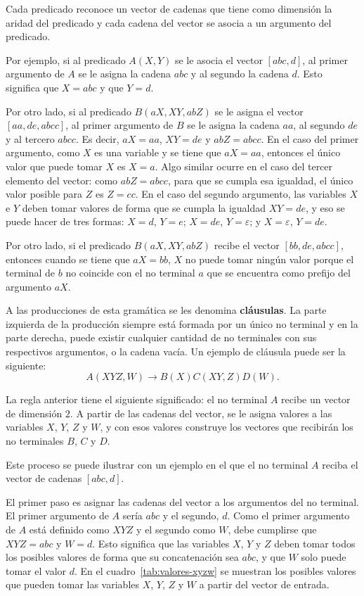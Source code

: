 \documentclass{report}
\theoremstyle{definition}
\theoremstyle{plain}
\theoremstyle{remark}
\begin{document}
Cada predicado reconoce un vector de cadenas que tiene como dimensión la
aridad del predicado y cada cadena del vector se asocia a un argumento
del predicado.

Por ejemplo, si al predicado $A(X, Y)$ se le asocia el vector $[abc, d]$,
al primer argumento de $A$ se le asigna la cadena $abc$ y al segundo la
cadena $d$. Esto significa que $X = abc$ y que $Y = d$.

Por otro lado, si al predicado $B(aX, XY, abZ)$ se le asigna el vector
$[aa, de, abcc]$, al primer argumento de $B$ se le asigna la cadena $aa$,
al segundo $de$ y al tercero $abcc$. Es decir, $aX = aa$, $XY = de$ y
$abZ = abcc$. En el caso del primer argumento, como $X$ es una variable
y se tiene que $aX = aa$, entonces el único valor que puede tomar $X$ es
$X = a$. Algo similar ocurre en el caso del tercer elemento del vector:
como $abZ = abcc$, para que se cumpla esa igualdad, el único valor
posible para $Z$ es $Z = cc$. En el caso del segundo argumento, las
variables $X$ e $Y$ deben tomar valores de forma que se cumpla la
igualdad $XY = de$, y eso se puede hacer de tres formas: $X = d$,
$Y = e$; $X = de$, $Y = \varepsilon$; y $X = \varepsilon$, $Y = de$.

Por otro lado, si el predicado $B(aX, XY, abZ)$ recibe el vector
$[bb, de, abcc]$, entonces cuando se tiene que $aX = bb$, $X$ no puede
tomar ningún valor porque el terminal de $b$ no coincide con el no
terminal $a$ que se encuentra como prefijo del argumento $aX$.

A las producciones de esta gramática se les denomina \textbf{cláusulas}.
La parte izquierda de la producción siempre está formada por un único no
terminal y en la parte derecha, puede existir cualquier cantidad de no
terminales con sus respectivos argumentos, o la cadena vacía. Un ejemplo
de cláusula puede ser la siguiente:
\[
  A(XYZ, W) \to B(X) C(XY, Z) D(W).
\]

La regla anterior tiene el siguiente significado: el no terminal $A$
recibe un vector de dimensión $2$. A partir de las cadenas del vector,
se le asigna valores a las variables $X$, $Y$, $Z$ y $W$, y con esos
valores construye los vectores que recibirán los no terminales $B$, $C$
y $D$.

Este proceso se puede ilustrar con un ejemplo en el que el no terminal
$A$ reciba el vector de cadenas $[abc, d]$.

El primer paso es asignar las cadenas del vector a los argumentos del no
terminal. El primer argumento de $A$ sería $abc$ y el segundo, $d$.
Como el primer argumento de $A$ está definido como $XYZ$ y el segundo
como $W$, debe cumplirse que $XYZ = abc$ y $W = d$. Esto significa que
las variables $X$, $Y$ y $Z$ deben tomar todos los posibles valores de
forma que su concatenación sea $abc$, y que $W$ solo puede tomar el valor
$d$. En el cuadro~\ref{tab:valores-xyzw} se muestran los posibles
valores que pueden tomar las variables $X$, $Y$, $Z$ y $W$ a partir del
vector de entrada.
\end{document}
